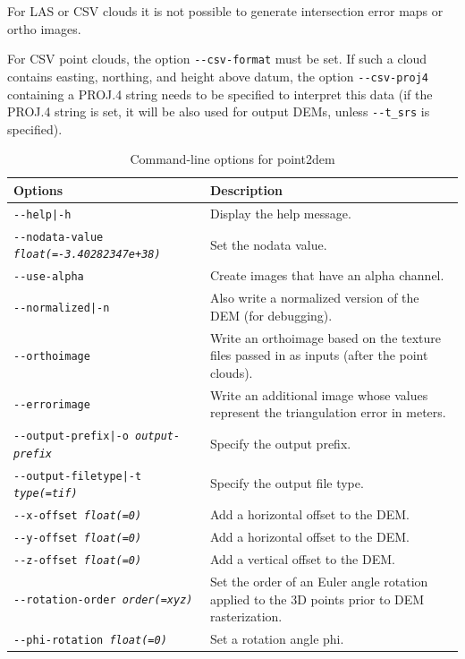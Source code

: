 For LAS or CSV clouds it is not possible to generate intersection error
maps or ortho images.

For CSV point clouds, the option \texttt{-\/-csv-format} must be set. If
such a cloud contains easting, northing, and height above datum, the
option \texttt{-\/-csv-proj4} containing a PROJ.4 string needs to be
specified to interpret this data (if the PROJ.4 string is set, it will be also
used for output DEMs, unless \texttt{-\/-t\_srs} is specified).

\begin{longtable}{|p{8cm}|p{9cm}|}
\caption{Command-line options for point2dem}
\label{tbl:point2dem}
\endfirsthead
\endhead
\endfoot
\endlastfoot
\hline
Options & Description \\ \hline \hline
\texttt{-\/-help|-h} & Display the help message. \\ \hline
\texttt{-\/-nodata-value \textit{float(=-3.40282347e+38)}} & Set the nodata value. \\ \hline
\texttt{-\/-use-alpha} & Create images that have an alpha channel. \\ \hline
\texttt{-\/-normalized|-n} & Also write a normalized version of the \ac{DEM} (for debugging). \\ \hline
\texttt{-\/-orthoimage} & Write an orthoimage based on the texture files passed in as inputs (after the point clouds). \\ \hline
\texttt{-\/-errorimage} & Write an additional image whose values represent the triangulation error in meters. \\ \hline
\texttt{-\/-output-prefix|-o \textit{output-prefix}} & Specify the output prefix. \\ \hline
\texttt{-\/-output-filetype|-t \textit{type(=tif)}} & Specify the output file type. \\ \hline
\hline
\texttt{-\/-x-offset \textit{float(=0)}} & Add a horizontal offset to the \ac{DEM}. \\ \hline
\texttt{-\/-y-offset \textit{float(=0)}} & Add a horizontal offset to the \ac{DEM}. \\ \hline
\texttt{-\/-z-offset \textit{float(=0)}} & Add a vertical offset to the \ac{DEM}. \\ \hline
\texttt{-\/-rotation-order \textit{order(=xyz)}} & Set the order of an Euler angle rotation applied to the 3D points prior to \ac{DEM} rasterization. \\ \hline
\texttt{-\/-phi-rotation \textit{float(=0)}} & Set a rotation angle phi. \\ \hline

\end{longtable}

